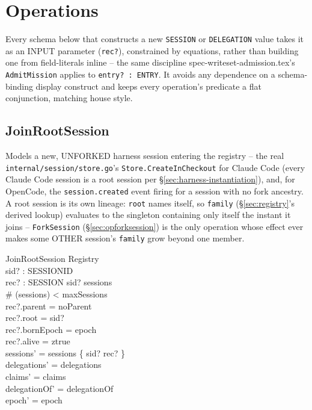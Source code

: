 \documentclass[a4paper,10pt,fleqn]{article}
\newcommand{\fpath}[1]{\texttt{#1}}
\newcommand{\field}[1]{\texttt{#1}}
\begin{document}
\section{Operations}
\label{sec:ops}

Every schema below that constructs a new \field{SESSION} or
\field{DELEGATION} value takes it as an INPUT parameter
(\field{rec?}), constrained by equations, rather than building one from
field-literals inline -- the same discipline
spec-writeset-admission.tex's \field{AdmitMission} applies to
\field{entry? : ENTRY}. It avoids any dependence on a schema-binding
display construct and keeps every operation's predicate a flat
conjunction, matching house style.

\subsection{JoinRootSession}
\label{sec:opjoin}

Models a new, UNFORKED harness session entering the registry -- the
real \fpath{internal/session/store.go}'s \field{Store.CreateInCheckout}
for Claude Code (every Claude Code session is a root session per
\S\ref{sec:harness-instantiation}), and, for OpenCode, the
\field{session.created} event firing for a session with no fork
ancestry. A root session is its own lineage: \field{root} names
itself, so \field{family} (\S\ref{sec:registry}'s derived lookup)
evaluates to the singleton containing only itself the instant it joins
-- \field{ForkSession} (\S\ref{sec:opforksession}) is the only
operation whose effect ever makes some OTHER session's \field{family}
grow beyond one member.

\begin{schema}{JoinRootSession}
\Delta Registry \\
sid? : SESSIONID \\
rec? : SESSION
\where
sid? \notin \dom sessions \\
\# (\dom sessions) < maxSessions \\
rec?.parent = noParent \\
rec?.root = sid? \\
rec?.bornEpoch = epoch \\
rec?.alive = ztrue \\
sessions' = sessions \oplus \{ sid? \mapsto rec? \} \\
delegations' = delegations \\
claims' = claims \\
delegationOf' = delegationOf \\
epoch' = epoch
\end{schema}
\end{document}
